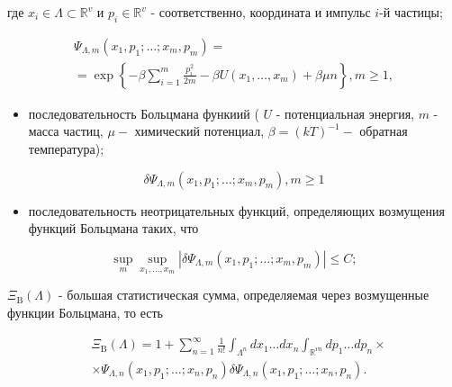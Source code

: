 \documentclass[10pt]{article}
\begin{document}
где $x_{i} \in \Lambda \subset \mathbb{R}^{v}$ и $p_{i} \in \mathbb{R}^{v}$ - соответственно, координата и импульс $i$-й частицы;



\[

\begin{gathered}

\Psi_{\Lambda, m}\left(x_{1}, p_{1} ; \ldots ; x_{m}, p_{m}\right)= \\

=\exp \left\{-\beta \sum_{i=1}^{m} \frac{p_{i}^{2}}{2 m}-\beta U\left(x_{1}, \ldots, x_{m}\right)+\beta \mu n\right\}, m \geqslant 1,

\end{gathered}

\]



\begin{itemize}

  \item последовательность Больцмана функиий ( $U$ - потенциальная энергия, $m$ - масса частиц, $\mu-$ химический потенциал, $\beta=(k T)^{-1}-$ обратная температура);

\end{itemize}



\[

\delta \Psi_{\Lambda, m}\left(x_{1}, p_{1} ; \ldots ; x_{m}, p_{m}\right), m \geqslant 1

\]



\begin{itemize}

  \item последовательность неотрицательных функций, определяющих возмущения функций Больцмана таких, что

\end{itemize}



\[

\sup _{m} \sup _{x_{1}, \ldots, x_{m}}\left|\delta \Psi_{\Lambda, m}\left(x_{1}, p_{1} ; \ldots ; x_{m}, p_{m}\right)\right| \leqslant C ;

\]



$\Xi_{\mathrm{B}}(\Lambda)$ - большая статистическая сумма, определяемая через возмущенные функции Больцмана, то есть



\[

\begin{aligned}

& \Xi_{\mathrm{B}}(\Lambda)=1+\sum_{n=1}^{\infty} \frac{1}{n !} \int_{\Lambda^{n}} d x_{1} \ldots d x_{n} \int_{\mathbb{R}^{v n}} d p_{1} \ldots d p_{n} \times \\

& \times \Psi_{\Lambda, n}\left(x_{1}, p_{1} ; \ldots ; x_{n}, p_{n}\right) \delta \Psi_{\Lambda, n}\left(x_{1}, p_{1} ; \ldots ; x_{n}, p_{n}\right) .

\end{aligned}

\]
\end{document}
